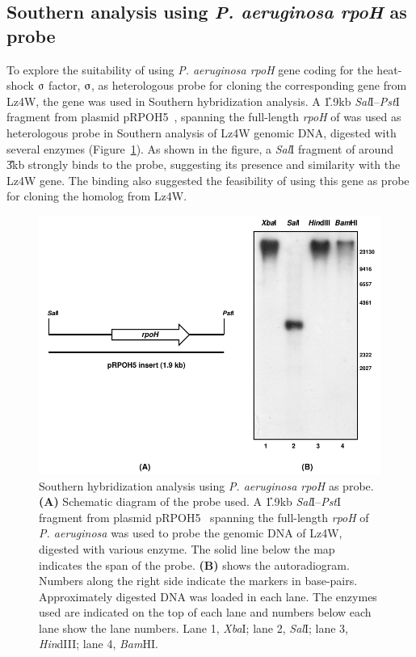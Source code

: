 \subsection{Southern analysis using \emph{P. aeruginosa rpoH} as
probe}

To explore the suitability of using \emph{P. aeruginosa rpoH} gene
coding for the heat-shock $\sigmaup$ factor, $\sigmaup$, as
heterologous probe for cloning the corresponding gene from Lz4W,
the gene was used in Southern hybridization analysis. A
\U{1.9}{kb} \emph{Sal}I--\emph{Pst}I fragment from plasmid
pRPOH5~\citep{Aramaki1996}, spanning the full-length \emph{rpoH}
of  was used as heterologous probe in Southern analysis
of Lz4W genomic DNA, digested with several enzymes
(Figure~\ref{chap3:rpoh_southern}). As shown in the figure, a
\emph{Sal}I fragment of around \U{3}{kb} strongly binds to the
probe, suggesting its presence and similarity with the Lz4W gene.
The binding also suggested the feasibility of using this gene as
probe for cloning the homolog from Lz4W.

\begin{figure}[tbp]
\centering
\begin{narrow}{-1in}{0in}
\flushright
\includegraphics{figures/chap3_rpoh}
\end{narrow}
\caption[Southern analysis using \emph{P. aeruginosa rpoH}]{%
    Southern hybridization analysis using \emph{P. aeruginosa rpoH} as probe. \textbf{(A)} Schematic diagram of the probe
    used. A \U{1.9}{kb} \emph{Sal}I--\emph{Pst}I fragment from
    plasmid pRPOH5~\citep{Aramaki1996} spanning the full-length \emph{rpoH}
    of \emph{P. aeruginosa} was used to probe the genomic DNA
    of Lz4W, digested with various enzyme. The solid line below
    the map indicates the span of the probe. \textbf{(B)}
    shows the autoradiogram. Numbers along the right side
    indicate the markers in base-pairs. Approximately  digested
    DNA was loaded in each lane. The enzymes used are indicated on the
    top of each lane and numbers below each lane show the lane
    numbers. Lane 1, \emph{Xba}I; lane 2, \emph{Sal}I; lane 3, \emph{Hin}dIII;
    lane 4, \emph{Bam}HI.}
\label{chap3:rpoh_southern}
\end{figure}



